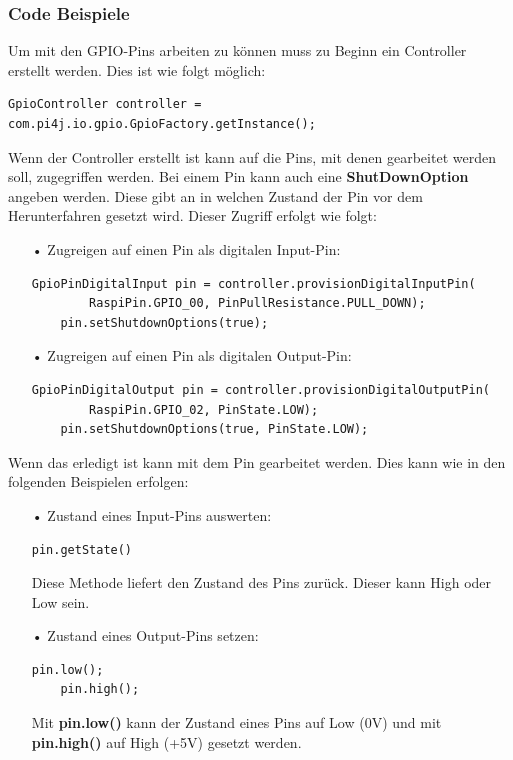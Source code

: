 \subsubsection{Code Beispiele}
Um mit den GPIO-Pins arbeiten zu können muss zu Beginn ein Controller erstellt werden. Dies ist wie folgt möglich:
\begin{lstlisting}[style=JavaStyle, caption=GPIO-Controller erstellen]
	GpioController controller = com.pi4j.io.gpio.GpioFactory.getInstance();
\end{lstlisting}
Wenn der Controller erstellt ist kann auf die Pins, mit denen gearbeitet werden soll, zugegriffen werden. Bei einem Pin kann auch eine \textbf{ShutDownOption} angeben werden. Diese gibt an in welchen Zustand der Pin vor dem Herunterfahren gesetzt wird. Dieser Zugriff erfolgt wie folgt: 
\begin{itemize}
\item[•] Zugreigen auf einen Pin als digitalen Input-Pin:
\begin{lstlisting}[style=JavaStyle, caption=Zugriff auf einen Pin als Inpput]
	GpioPinDigitalInput pin = controller.provisionDigitalInputPin(
		RaspiPin.GPIO_00, PinPullResistance.PULL_DOWN);
	pin.setShutdownOptions(true);
\end{lstlisting}
\item[•] Zugreigen auf einen Pin als digitalen Output-Pin:
\begin{lstlisting}[style=JavaStyle, caption=Zugriff auf einen Pin als Output]
	GpioPinDigitalOutput pin = controller.provisionDigitalOutputPin(
		RaspiPin.GPIO_02, PinState.LOW);
	pin.setShutdownOptions(true, PinState.LOW);
\end{lstlisting}
\end{itemize}
Wenn das erledigt ist kann mit dem Pin gearbeitet werden. Dies kann wie in den folgenden Beispielen erfolgen:
\begin{itemize}
\item[•] Zustand eines Input-Pins auswerten: 
\begin{lstlisting}[style=JavaStyle, caption=Pinzustand abfragen]
	pin.getState()
\end{lstlisting}
Diese Methode liefert den Zustand des Pins zurück. Dieser kann High oder Low sein.
\item[•] Zustand eines Output-Pins setzen:
\begin{lstlisting}[style=JavaStyle, caption=Pinzustand verändern]
	pin.low();	
	pin.high();
\end{lstlisting}
Mit \textbf{pin.low()} kann der Zustand eines Pins auf Low (0V) und mit \textbf{pin.high()} auf High (+5V) gesetzt werden. 
\end{itemize}


